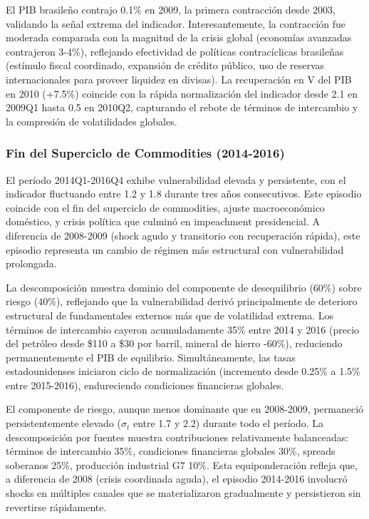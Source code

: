 \documentclass[3p,11pt,draft,natbib=false]{elsarticle}
\begin{document}
El PIB brasileño contrajo 0.1\% en 2009, la primera contracción desde 2003, validando la señal extrema del indicador. Interesantemente, la contracción fue moderada comparada con la magnitud de la crisis global (economías avanzadas contrajeron 3-4\%), reflejando efectividad de políticas contracíclicas brasileñas (estímulo fiscal coordinado, expansión de crédito público, uso de reservas internacionales para proveer liquidez en divisas). La recuperación en V del PIB en 2010 (+7.5\%) coincide con la rápida normalización del indicador desde 2.1 en 2009Q1 hasta 0.5 en 2010Q2, capturando el rebote de términos de intercambio y la compresión de volatilidades globales.

\subsubsection{Fin del Superciclo de Commodities (2014-2016)}

El período 2014Q1-2016Q4 exhibe vulnerabilidad elevada y persistente, con el indicador fluctuando entre 1.2 y 1.8 durante tres años consecutivos. Este episodio coincide con el fin del superciclo de commodities, ajuste macroeconómico doméstico, y crisis política que culminó en impeachment presidencial. A diferencia de 2008-2009 (shock agudo y transitorio con recuperación rápida), este episodio representa un cambio de régimen más estructural con vulnerabilidad prolongada.

La descomposición muestra dominio del componente de desequilibrio (60\%) sobre riesgo (40\%), reflejando que la vulnerabilidad derivó principalmente de deterioro estructural de fundamentales externos más que de volatilidad extrema. Los términos de intercambio cayeron acumuladamente 35\% entre 2014 y 2016 (precio del petróleo desde \$110 a \$30 por barril, mineral de hierro -60\%), reduciendo permanentemente el PIB de equilibrio. Simultáneamente, las tasas estadounidenses iniciaron ciclo de normalización (incremento desde 0.25\% a 1.5\% entre 2015-2016), endureciendo condiciones financieras globales.

El componente de riesgo, aunque menos dominante que en 2008-2009, permaneció persistentemente elevado ($\sigma_t$ entre 1.7 y 2.2) durante todo el período. La descomposición por fuentes muestra contribuciones relativamente balanceadas: términos de intercambio 35\%, condiciones financieras globales 30\%, spreads soberanos 25\%, producción industrial G7 10\%. Esta equiponderación refleja que, a diferencia de 2008 (crisis coordinada aguda), el episodio 2014-2016 involucró shocks en múltiples canales que se materializaron gradualmente y persistieron sin revertirse rápidamente.
\end{document}
